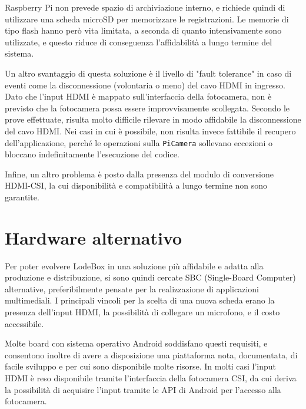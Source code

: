 
Raspberry Pi non prevede spazio di archiviazione interno, e richiede quindi di utilizzare una scheda microSD per memorizzare le registrazioni. Le memorie di tipo flash hanno però vita limitata, a seconda di quanto intensivamente sono utilizzate, e questo riduce di conseguenza l'affidabilità a lungo termine del sistema.

Un altro svantaggio di questa soluzione è il livello di "fault tolerance" in caso di eventi come la disconnessione (volontaria o meno) del cavo HDMI in ingresso. Dato che l'input HDMI è mappato sull'interfaccia della fotocamera, non è previsto che la fotocamera possa essere improvvisamente scollegata. Secondo le prove effettuate, risulta molto difficile rilevare in modo affidabile la disconnessione del cavo HDMI. Nei casi in cui è possibile, non risulta invece fattibile il recupero dell'applicazione, perché le operazioni sulla \texttt{PiCamera} sollevano eccezioni o bloccano indefinitamente l'esecuzione del codice.

Infine, un altro problema è posto dalla presenza del modulo di conversione HDMI-CSI, la cui disponibilità e compatibilità a lungo termine non sono garantite.

\section{Hardware alternativo}
\label{sec:intro_hardware}

Per poter evolvere LodeBox in una soluzione più affidabile e adatta alla produzione e distribuzione, si sono quindi cercate SBC (Single-Board Computer) alternative, preferibilmente pensate per la realizzazione di applicazioni multimediali. I principali vincoli per la scelta di una nuova scheda erano la presenza dell'input HDMI, la possibilità di collegare un microfono, e il costo accessibile.

Molte board con sistema operativo Android soddisfano questi requisiti, e consentono inoltre di avere a disposizione una piattaforma nota, documentata, di facile sviluppo e per cui sono disponibile molte risorse. In molti casi l'input HDMI è reso disponibile tramite l'interfaccia della fotocamera CSI, da cui deriva la possibilità di acquisire l'input tramite le API di Android per l'accesso alla fotocamera.

